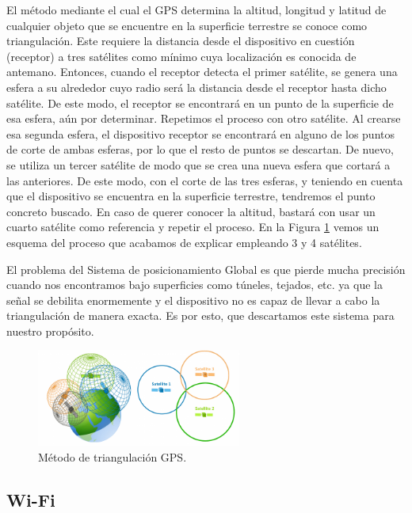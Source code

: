 El método mediante el cual el GPS determina la altitud, longitud y latitud de cualquier objeto que se encuentre en la superficie terrestre se conoce como triangulación. Este requiere la distancia desde el dispositivo en cuestión (receptor) a tres satélites como mínimo cuya localización es conocida de antemano. Entonces, cuando el receptor detecta el primer satélite, se genera una esfera a su alrededor cuyo radio será la distancia desde el receptor hasta dicho satélite. De este modo, el receptor se encontrará en un punto de la superficie de esa esfera, aún por determinar. Repetimos el proceso con otro satélite. Al crearse esa segunda esfera, el dispositivo receptor se encontrará en alguno de los puntos de corte de ambas esferas, por lo que el resto de puntos se descartan. De nuevo, se utiliza un tercer satélite de modo que se crea una nueva esfera que cortará a las
anteriores. De este modo, con el corte de las tres esferas, y teniendo en cuenta que el dispositivo se encuentra en la superficie terrestre, tendremos el punto concreto buscado. En caso de querer conocer la altitud, bastará con usar un cuarto satélite como referencia y repetir el proceso. En la Figura \ref{fig:ejemplogps} vemos un esquema del proceso que acabamos de explicar empleando 3 y 4 satélites.

El problema del Sistema de posicionamiento Global es que pierde mucha precisión cuando nos encontramos bajo superficies como túneles, tejados, etc. ya que la señal se debilita enormemente y el dispositivo no es capaz de llevar a cabo la triangulación de manera exacta. Es por esto, que descartamos este sistema para nuestro propósito.

\begin{figure}[t]
	\centering
	\includegraphics[width=0.6\textwidth]{Imagenes/Estadodelacuestion/triangulacion}
	\caption{Método de triangulación GPS. }
	\label{fig:ejemplogps}
\end{figure}


\subsection{Wi-Fi}

